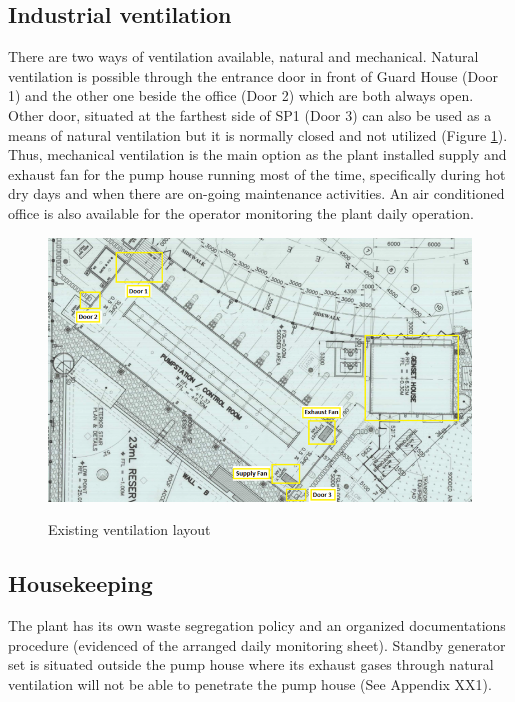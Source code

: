 \subsection{Industrial ventilation}\label{aq04}
There are two ways of ventilation available, natural and mechanical. Natural ventilation is possible through the entrance door in front of Guard House (Door 1) and the other one beside the office (Door 2) which are both always open. Other door, situated at the farthest side of SP1 (Door 3) can also be used as a means of natural ventilation but it is normally closed and not utilized (Figure \ref{ch04_fig_ventilation01}). Thus, mechanical ventilation is the main option as the plant installed supply and exhaust fan for the pump house running most of the time, specifically during hot dry days and when there are on-going maintenance activities. An air conditioned office is also available for the operator monitoring the plant daily operation.

\begin{figure}[!htb]
	\includegraphics[scale=2]{figures/ch04_fig_ventilation01} \\
	\caption{Existing ventilation layout}
	\label{ch04_fig_ventilation01} 
\end{figure}

\subsection{Housekeeping}\label{aq05}
The plant has its own waste segregation policy and an organized documentations procedure (evidenced of the arranged daily monitoring sheet). Standby generator set is situated outside the pump house where its exhaust gases through natural ventilation will not be able to penetrate the pump house (See Appendix XX1). 


